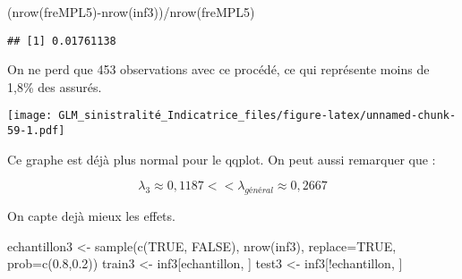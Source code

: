 \documentclass[
]{article}
\newenvironment{Shaded}{\begin{snugshade}}{\end{snugshade}}
\newcommand{\AttributeTok}[1]{\textcolor[rgb]{0.77,0.63,0.00}{#1}}
\newcommand{\ConstantTok}[1]{\textcolor[rgb]{0.00,0.00,0.00}{#1}}
\newcommand{\DecValTok}[1]{\textcolor[rgb]{0.00,0.00,0.81}{#1}}
\newcommand{\FloatTok}[1]{\textcolor[rgb]{0.00,0.00,0.81}{#1}}
\newcommand{\FunctionTok}[1]{\textcolor[rgb]{0.00,0.00,0.00}{#1}}
\newcommand{\NormalTok}[1]{#1}
\newcommand{\OtherTok}[1]{\textcolor[rgb]{0.56,0.35,0.01}{#1}}
\newcommand{\SpecialCharTok}[1]{\textcolor[rgb]{0.00,0.00,0.00}{#1}}
\newcommand{\StringTok}[1]{\textcolor[rgb]{0.31,0.60,0.02}{#1}}
\begin{document}
\begin{Shaded}
\begin{Highlighting}[]
\NormalTok{(}\FunctionTok{nrow}\NormalTok{(freMPL5)}\SpecialCharTok{{-}}\FunctionTok{nrow}\NormalTok{(inf3))}\SpecialCharTok{/}\FunctionTok{nrow}\NormalTok{(freMPL5)}
\end{Highlighting}
\end{Shaded}

\begin{verbatim}
## [1] 0.01761138
\end{verbatim}

On ne perd que 453 observations avec ce procédé, ce qui représente moins
de 1,8\% des assurés.

\begin{Shaded}
\end{Shaded}

\texttt{[image: GLM\_sinistralité\_Indicatrice\_files/figure-latex/unnamed-chunk-59-1.pdf]}

Ce graphe est déjà plus normal pour le qqplot. On peut aussi remarquer
que :

\[
 \lambda_3 \approx 0,1187 << \lambda_{général} \approx 0,2667
\]

On capte dejà mieux les effets.

\begin{Shaded}
\begin{Highlighting}[]
\NormalTok{echantillon3 }\OtherTok{\textless{}{-}} \FunctionTok{sample}\NormalTok{(}\FunctionTok{c}\NormalTok{(}\ConstantTok{TRUE}\NormalTok{, }\ConstantTok{FALSE}\NormalTok{), }\FunctionTok{nrow}\NormalTok{(inf3), }\AttributeTok{replace=}\ConstantTok{TRUE}\NormalTok{, }\AttributeTok{prob=}\FunctionTok{c}\NormalTok{(}\FloatTok{0.8}\NormalTok{,}\FloatTok{0.2}\NormalTok{))}
\NormalTok{train3  }\OtherTok{\textless{}{-}}\NormalTok{ inf3[echantillon, ]}
\NormalTok{test3   }\OtherTok{\textless{}{-}}\NormalTok{ inf3[}\SpecialCharTok{!}\NormalTok{echantillon, ]}
\end{Highlighting}
\end{Shaded}
\end{document}
